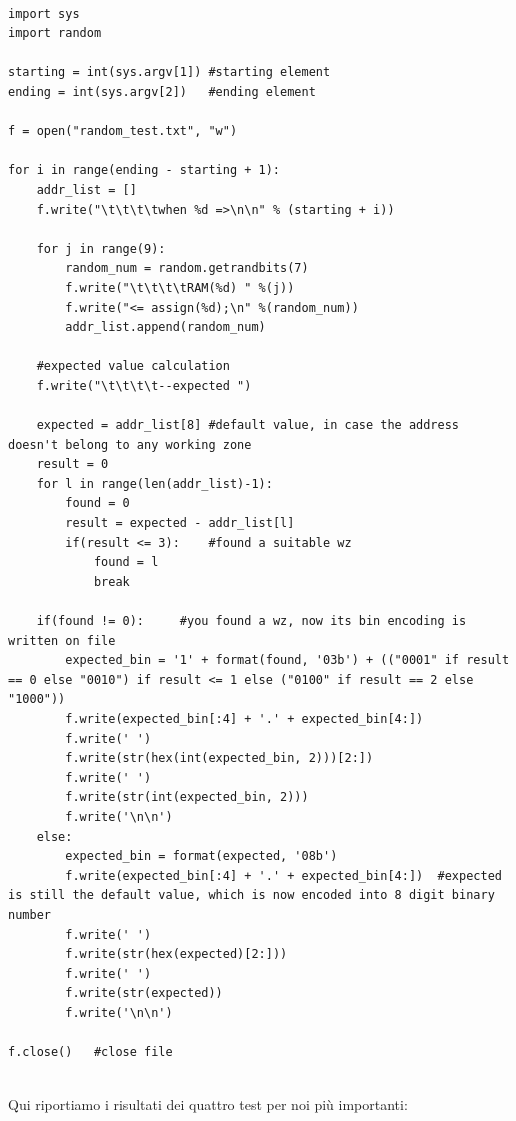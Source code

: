\documentclass[12pt,a4paper,titlepage]{article}
\begin{document}
	\begin{lstlisting}
	
import sys
import random

starting = int(sys.argv[1])	#starting element
ending = int(sys.argv[2])	#ending element

f = open("random_test.txt", "w")

for i in range(ending - starting + 1):
	addr_list = []
	f.write("\t\t\t\twhen %d =>\n\n" % (starting + i))
	
	for j in range(9):
		random_num = random.getrandbits(7)
		f.write("\t\t\t\tRAM(%d) " %(j))
		f.write("<= assign(%d);\n" %(random_num))
		addr_list.append(random_num)

	#expected value calculation
	f.write("\t\t\t\t--expected ")

	expected = addr_list[8]	#default value, in case the address doesn't belong to any working zone
	result = 0
	for l in range(len(addr_list)-1):
		found = 0
		result = expected - addr_list[l]
		if(result <= 3):	#found a suitable wz
			found = l
			break
	
	if(found != 0):		#you found a wz, now its bin encoding is written on file
		expected_bin = '1' + format(found, '03b') + (("0001" if result == 0 else "0010") if result <= 1 else ("0100" if result == 2 else "1000"))
		f.write(expected_bin[:4] + '.' + expected_bin[4:])
		f.write(' ')
		f.write(str(hex(int(expected_bin, 2)))[2:])
		f.write(' ')
		f.write(str(int(expected_bin, 2)))
		f.write('\n\n')
	else:
		expected_bin = format(expected, '08b')
		f.write(expected_bin[:4] + '.' + expected_bin[4:])	#expected is still the default value, which is now encoded into 8 digit binary number
		f.write(' ')
		f.write(str(hex(expected)[2:]))
		f.write(' ')
		f.write(str(expected))
		f.write('\n\n')

f.close()	#close file	
	
	\end{lstlisting}
	
	\newpage


Qui riportiamo i risultati dei quattro test per noi più importanti:
\end{document}
